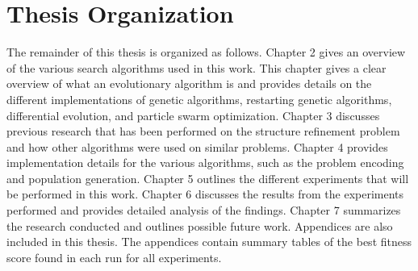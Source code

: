\section{Thesis Organization}

The remainder of this thesis is organized as follows. Chapter 2 gives an overview of the various search algorithms used in this work. This chapter gives a clear overview of what an evolutionary algorithm is and provides details on the different implementations of genetic algorithms, restarting genetic algorithms, differential evolution, and particle swarm optimization. Chapter 3 discusses previous research that has been performed on the structure refinement problem and how other algorithms were used on similar problems. Chapter 4 provides implementation details for the various algorithms, such as the problem encoding and population generation. Chapter 5 outlines the different experiments that will be performed in this work. Chapter 6 discusses the results from the experiments performed and provides detailed analysis of the findings. Chapter 7 summarizes the research conducted and outlines possible future work. Appendices are also included in this thesis. The appendices contain summary tables of the best fitness score found in each run for all experiments.